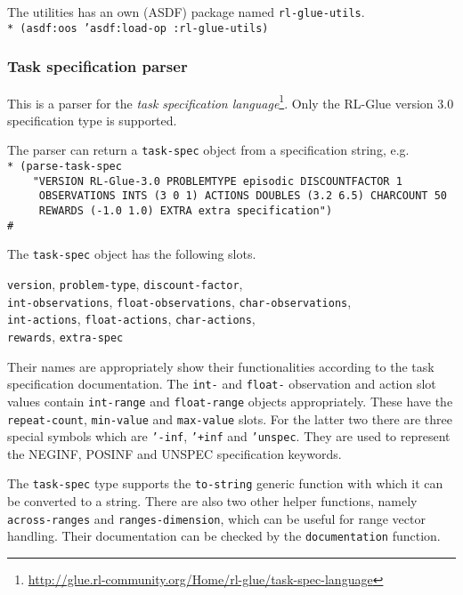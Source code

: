 \documentclass[11pt,a4paper,dvipdfm]{article}
\newcommand{\selfref}[1]{\href{#1}{#1}}
\newcommand{\footref}[2]{\textsl{#1}\footnote{\selfref{#2}}}
\newcommand{\prompttext}[1]{\texttt{#1}}
\newcommand{\lispprompt}[1]{\prompttext{* #1}}
\begin{document}
The utilities has an own (ASDF) package named \prompttext{rl-glue-utils}. \\
\lispprompt{(asdf:oos 'asdf:load-op :rl-glue-utils)}

\subsubsection{Task specification parser}

This is a parser for the
\footref{task specification language}
{http://glue.rl-community.org/Home/rl-glue/task-spec-language}. Only the
RL-Glue version 3.0 specification type is supported.

The parser can return a \prompttext{task-spec} object from a specification
string, e.g. \\
\lispprompt{(parse-task-spec \\
\mbox{~~~~}"VERSION RL-Glue-3.0 PROBLEMTYPE episodic DISCOUNTFACTOR 1 \\
\mbox{~~~~~}OBSERVATIONS INTS (3 0 1) ACTIONS DOUBLES (3.2 6.5) CHARCOUNT 50 \\
\mbox{~~~~~}REWARDS (-1.0 1.0) EXTRA extra specification") \\
\#<TASK-SPEC>}

The \prompttext{task-spec} object has the following slots.

\prompttext{version}, \prompttext{problem-type}, \prompttext{discount-factor}, \\
\prompttext{int-observations}, \prompttext{float-observations},
\prompttext{char-observations}, \\ \prompttext{int-actions},
\prompttext{float-actions}, \prompttext{char-actions}, \\
\prompttext{rewards}, \prompttext{extra-spec}

Their names are appropriately show their functionalities according to the task
specification documentation. The \prompttext{int-} and \prompttext{float-}
observation and action slot values contain \prompttext{int-range} and
\prompttext{float-range} objects appropriately. These have the
\prompttext{repeat-count}, \prompttext{min-value} and \prompttext{max-value}
slots. For the latter two there are three special symbols which are
\prompttext{'-inf}, \prompttext{'+inf} and \prompttext{'unspec}. They are used
to represent the NEGINF, POSINF and UNSPEC specification keywords.

The \prompttext{task-spec} type supports the \prompttext{to-string} generic
function with which it can be converted to a string. There are also two other
helper functions, namely \prompttext{across-ranges} and
\prompttext{ranges-dimension}, which can be useful for range vector handling.
Their documentation can be checked by the \prompttext{documentation} function.
\end{document}
